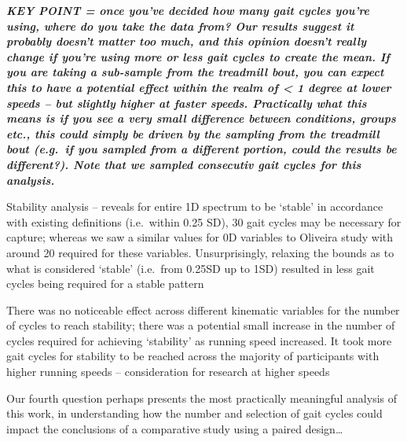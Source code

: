 \documentclass[]{elsarticle} %
\begin{document}
\textbf{\emph{KEY POINT = once you've decided how many gait cycles
you're using, where do you take the data from? Our results suggest it
probably doesn't matter too much, and this opinion doesn't really change
if you're using more or less gait cycles to create the mean. If you are
taking a sub-sample from the treadmill bout, you can expect this to have
a potential effect within the realm of \textless{} 1 degree at lower
speeds -- but slightly higher at faster speeds. Practically what this
means is if you see a very small difference between conditions, groups
etc., this could simply be driven by the sampling from the treadmill
bout (e.g.~if you sampled from a different portion, could the results be
different?). Note that we sampled consecutiv gait cycles for this
analysis.}}

Stability analysis -- reveals for entire 1D spectrum to be `stable' in
accordance with existing definitions (i.e.~within 0.25 SD), 30 gait
cycles may be necessary for capture; whereas we saw a similar values for
0D variables to Oliveira study with around 20 required for these
variables. Unsurprisingly, relaxing the bounds as to what is considered
`stable' (i.e.~from 0.25SD up to 1SD) resulted in less gait cycles being
required for a stable pattern

There was no noticeable effect across different kinematic variables for
the number of cycles to reach stability; there was a potential small
increase in the number of cycles required for achieving `stability' as
running speed increased. It took more gait cycles for stability to be
reached across the majority of participants with higher running speeds
-- consideration for research at higher speeds

Our fourth question perhaps presents the most practically meaningful
analysis of this work, in understanding how the number and selection of
gait cycles could impact the conclusions of a comparative study using a
paired design\ldots{}
\end{document}
